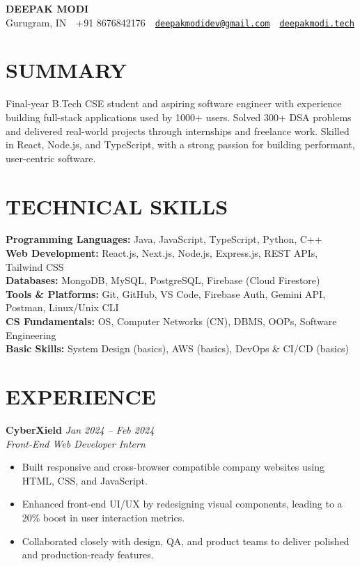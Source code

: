\documentclass[a4paper,11pt]{article}
\begin{document}
\small
\begin{center}
    {\huge \textbf{DEEPAK MODI}} \\
    \vspace{6pt}
    Gurugram, IN~\textbar~+91 8676842176~\textbar~\href{mailto:deepakmodidev@gmail.com}{\nolinkurl{deepakmodidev@gmail.com}}~\textbar~\href{https://deepakmodi.tech}{\texttt{deepakmodi.tech}}
\end{center}

\section*{SUMMARY}
Final-year B.Tech CSE student and aspiring software engineer with experience building full-stack applications used by 1000+ users. Solved 300+ DSA problems and delivered real-world projects through internships and freelance work. Skilled in React, Node.js, and TypeScript, with a strong passion for building performant, user-centric software.

\section*{TECHNICAL SKILLS}
\textbf{Programming Languages:} Java, JavaScript, TypeScript, Python, C++ \\
\textbf{Web Development:} React.js, Next.js, Node.js, Express.js, REST APIs, Tailwind CSS \\
\textbf{Databases:} MongoDB, MySQL, PostgreSQL, Firebase (Cloud Firestore) \\
\textbf{Tools \& Platforms:} Git, GitHub, VS Code, Firebase Auth, Gemini API, Postman, Linux/Unix CLI \\
\textbf{CS Fundamentals:} OS, Computer Networks (CN), DBMS, OOPs, Software Engineering \\
\textbf{Basic Skills:} System Design (basics), AWS (basics), DevOps & CI/CD (basics)

\section*{EXPERIENCE}
\textbf{CyberXield} \hfill \textit{Jan 2024 -- Feb 2024} \\
\textit{Front-End Web Developer Intern}
\begin{itemize}
    \item Built responsive and cross-browser compatible company websites using HTML, CSS, and JavaScript.
    \item Enhanced front-end UI/UX by redesigning visual components, leading to a 20\% boost in user interaction metrics.
    \item Collaborated closely with design, QA, and product teams to deliver polished and production-ready features.
\end{itemize}
\end{document}
